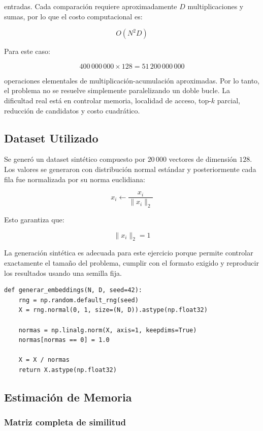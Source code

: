 \documentclass[10pt,a4paper]{article}
\begin{document}
entradas. Cada comparaci\'on requiere aproximadamente $D$ multiplicaciones y
sumas, por lo que el costo computacional es:

\[
O(N^2D)
\]

Para este caso:

\[
400\,000\,000 \times 128 = 51\,200\,000\,000
\]

operaciones elementales de multiplicaci\'on-acumulaci\'on aproximadas. Por lo
tanto, el problema no se resuelve simplemente paralelizando un doble bucle. La
dificultad real est\'a en controlar memoria, localidad de acceso, top-$k$
parcial, reducci\'on de candidatos y costo cuadr\'atico.

\subsection{Dataset Utilizado}

Se gener\'o un dataset sint\'etico compuesto por $20\,000$ vectores de
dimensi\'on $128$. Los valores se generaron con distribuci\'on normal est\'andar
y posteriormente cada fila fue normalizada por su norma euclidiana:

\[
x_i \leftarrow \frac{x_i}{\|x_i\|_2}
\]

Esto garantiza que:

\[
\|x_i\|_2 = 1
\]

La generaci\'on sint\'etica es adecuada para este ejercicio porque permite
controlar exactamente el tama\~no del problema, cumplir con el formato exigido
y reproducir los resultados usando una semilla fija.

\begin{lstlisting}[caption={Generaci\'on de embeddings sint\'eticos normalizados.}]
def generar_embeddings(N, D, seed=42):
    rng = np.random.default_rng(seed)
    X = rng.normal(0, 1, size=(N, D)).astype(np.float32)

    normas = np.linalg.norm(X, axis=1, keepdims=True)
    normas[normas == 0] = 1.0

    X = X / normas
    return X.astype(np.float32)
\end{lstlisting}

\subsection{Estimaci\'on de Memoria}

\subsubsection{Matriz completa de similitud}
\end{document}
